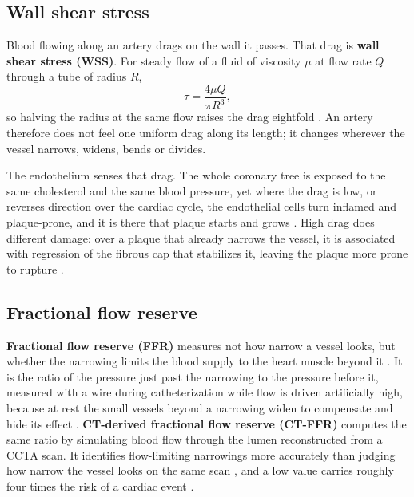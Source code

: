 \subsection{Wall shear stress}

Blood flowing along an artery drags on the wall it passes.
That drag is \textbf{wall shear stress (WSS)}.
For steady flow of a fluid of viscosity $\mu$ at flow rate $Q$ through a tube of radius $R$,
%
\begin{equation}
  \tau = \frac{4 \mu Q}{\pi R^{3}},
  \label{eq:wss}
\end{equation}
%
so halving the radius at the same flow raises the drag eightfold \cite{rampidis2022geometry}.
An artery therefore does not feel one uniform drag along its length; it changes wherever the vessel
narrows, widens, bends or divides.

The endothelium senses that drag.
The whole coronary tree is exposed to the same cholesterol and the same blood pressure, yet where
the drag is low, or reverses direction over the cardiac cycle, the endothelial cells turn inflamed
and plaque-prone, and it is there that plaque starts and grows \cite{chatzizisis2007ess}.
High drag does different damage: over a plaque that already narrows the vessel, it is associated
with regression of the fibrous cap that stabilizes it, leaving the plaque more prone to rupture
\cite{bajraktari2021highwss}.

\subsection{Fractional flow reserve}
\label{sec:ffr}

\textbf{Fractional flow reserve (FFR)} measures not how narrow a vessel looks, but whether the
narrowing limits the blood supply to the heart muscle beyond it \cite{knuuti2019esc}.
It is the ratio of the pressure just past the narrowing to the pressure before it, measured with a
wire during catheterization while flow is driven artificially high, because at rest the small
vessels beyond a narrowing widen to compensate and hide its effect \cite{duncker2015regulation}.
\textbf{CT-derived fractional flow reserve (CT-FFR)} computes the same ratio by simulating blood
flow through the lumen reconstructed from a CCTA scan.
It identifies flow-limiting narrowings more accurately than judging how narrow the vessel looks on
the same scan \cite{norgaard2014nxt}, and a low value carries roughly four times the risk of a
cardiac event \cite{biswas2026ffrct}.

